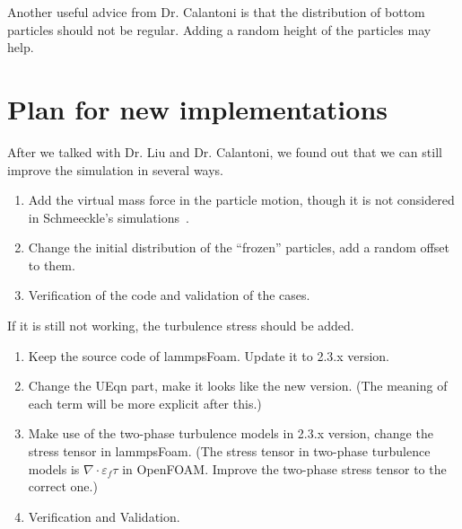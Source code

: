 \documentclass[11pt]{article}
\begin{document}
  Another useful advice from Dr. Calantoni is that the distribution of bottom particles should not
  be regular. Adding a random height of the particles may help.

\section{Plan for new implementations}
After we talked with Dr. Liu and Dr. Calantoni, we found out that we can still improve the
simulation in several ways.
  \begin{enumerate}
    \item Add the virtual mass force in the particle motion, though it is not considered in
      Schmeeckle's simulations~\cite{schmeeckle14ns}.
    \item Change the initial distribution of the ``frozen'' particles, add a random offset to them.
    \item Verification of the code and validation of the cases.
  \end{enumerate}

  If it is still not working, the turbulence stress should be added.
  \begin{enumerate}
    \item Keep the source code of lammpsFoam. Update it to 2.3.x version.
    \item Change the UEqn part, make it looks like the new version. (The meaning of each term will
      be more explicit after this.) 
    \item Make use of the two-phase turbulence models in 2.3.x version, change the stress tensor in
      lammpsFoam. (The stress tensor in two-phase turbulence models is $\nabla \cdot
      \varepsilon_f\tau$ in OpenFOAM. Improve the two-phase stress tensor to the correct one.)
    \item Verification and Validation.
  \end{enumerate}



\end{document}
